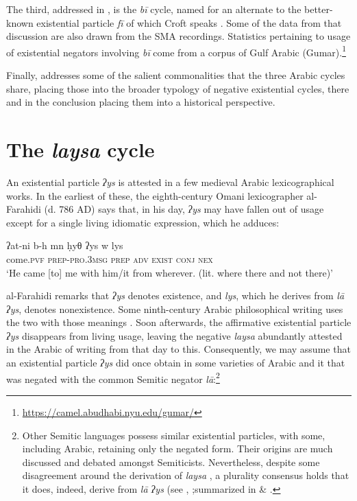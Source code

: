 \documentclass[output=paper]{langsci/langscibook}
\begin{document}
The third, addressed in , is the \textit{bī} cycle, named for an alternate to the better-known existential particle \textit{fī} of which Croft speaks \citeyearpar[7]{Croft1991}. Some of the data from that discussion are also drawn from the SMA recordings. Statistics pertaining to usage of existential negators involving \textit{bī} come from a corpus of Gulf Arabic (Gumar).\footnote{\url{https://camel.abudhabi.nyu.edu/gumar/}}

Finally,  addresses some of the salient commonalities that the three Arabic cycles share, placing those into the broader typology of negative existential cycles, there and in the conclusion placing them into a historical perspective.

\section{The \textit{laysa} cycle}
\label{s:WiAR-2}
An existential particle \textit{ʔys} is attested in a few medieval Arabic lexicographical works.
\footnotemark
{} In the earliest of these, the eighth-century Omani lexicographer al-Farahidi (d. 786 AD) says that, in his day, \textit{ʔys} may have fallen out of usage except for a single living idiomatic expression, which he adduces:

\ea \label{ex:WiAR-1}
	\gll ʔat-ni b-h mn ḥyθ ʔys w lys \\
	come.\textsc{pvf} \textsc{prep-pro.3msg} \textsc{prep} \textsc{adv} \textsc{exist} \textsc{conj} \textsc{nex}\\
	\glt `He came [to] me with him/it from wherever. (lit. where there and not there)' \citep[105]{al-far2003a}
\z

al-Farahidi remarks that \textit{ʔys} denotes existence, and \textit{lys}, which he derives from \textit{lā ʔys}, denotes nonexistence. Some ninth-century Arabic philosophical writing uses the two with those meanings \citep[35]{gihami-a}. Soon afterwards, the affirmative existential particle \textit{ʔys} disappears from living usage, leaving the negative \textit{laysa} abundantly attested in the Arabic of writing from that day to this. Consequently, we may assume that an existential particle \textit{ʔys} did once obtain in some varieties of Arabic and it that was negated with the common Semitic negator \textit{lā}:\footnote{Other Semitic languages possess similar existential particles, with some, including Arabic, retaining only the negated form. Their origins are much discussed and debated amongst Semiticists. Nevertheless, despite some disagreement around the derivation of \textit{laysa} \citep{wilmsen2016a, al-jallad2018a}, a plurality consensus holds that it does, indeed, derive from \textit{lā ʔys} (see \citet{blau1972a, gensler2000a}, \citet[464--465, 488--489]{lipi2001a};summarized in \citet[329--331]{wilmsen2016a} \& \citet[298--299]{wilmsen2017a}.}
\end{document}
